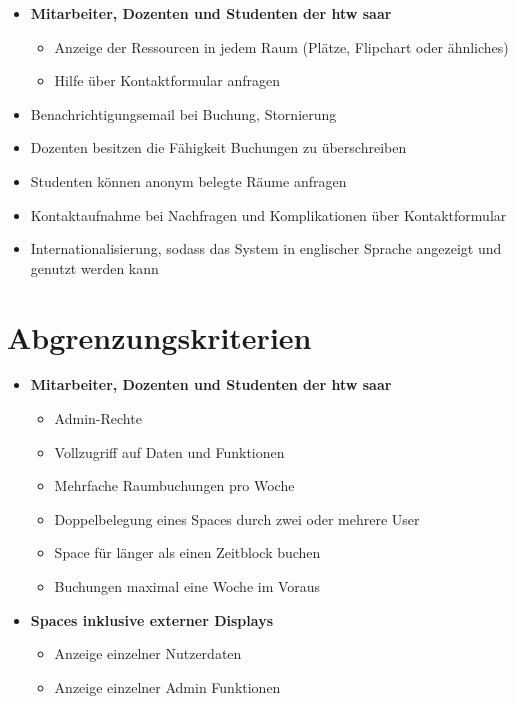 \documentclass[a4paper,report,headsepline]{scrreprt}
\begin{document}
\begin{itemize}
\item \textbf{Mitarbeiter, Dozenten und Studenten der htw saar}
\begin{itemize}
\item Anzeige der Ressourcen in jedem Raum (Plätze, Flipchart oder ähnliches)
\item Hilfe über Kontaktformular anfragen
\end{itemize}

\item Benachrichtigungsemail bei Buchung, Stornierung
\item Dozenten besitzen die Fähigkeit Buchungen zu überschreiben
\item Studenten können anonym belegte Räume anfragen
\item Kontaktaufnahme bei Nachfragen und Komplikationen über Kontaktformular
\item Internationalisierung, sodass das System in englischer Sprache angezeigt und genutzt werden kann
\end{itemize}

\section{Abgrenzungskriterien}\label{abgrenzungskriterien}
\begin{itemize}
\item \textbf{Mitarbeiter, Dozenten und Studenten der htw saar}
\begin{itemize}
\item Admin-Rechte 
\item Vollzugriff auf Daten und Funktionen
\item Mehrfache Raumbuchungen pro Woche 
\item Doppelbelegung eines Spaces durch zwei oder mehrere User
\item Space für länger als einen Zeitblock buchen
\item Buchungen maximal eine Woche im Voraus 
\end{itemize}

\item \textbf{Spaces inklusive externer Displays}
\begin{itemize}
\item Anzeige einzelner Nutzerdaten
\item Anzeige einzelner Admin Funktionen
\end{itemize}
\end{itemize}
\end{document}
